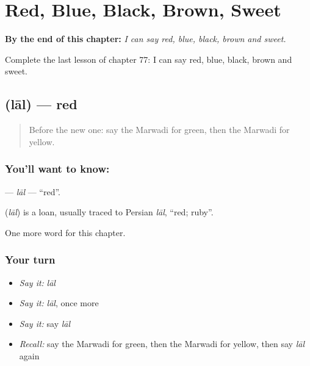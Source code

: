 
\chapter{Red, Blue, Black, Brown, Sweet}
\label{ch:mw-red-blue-black-brown-sweet}

\begin{chapteropening}
\textbf{By the end of this chapter:} \emph{I can say red, blue, black, brown and sweet.}

Complete the last lesson of chapter 77: I can say red, blue, black, brown and sweet.
\end{chapteropening}

\section[\texorpdfstring{\mw{लाल} (lāl)}{लाल (lāl)}]{ (lāl) — red}

\label{lesson:MW-C77-lal}



\begin{quote}
Before the new one: say the Marwadi for green, then the Marwadi for yellow.
\end{quote}

\subsection*{You'll want to know: }
\textbf{} — \emph{lāl} — \textquotedblleft{}red\textquotedblright{}.

\begin{cousinweb}
\textbf{} (\emph{lāl}) is a loan, usually traced to Persian \emph{lāl}, \textquotedblleft{}red; ruby\textquotedblright{}.
\end{cousinweb}

\begin{grammarlens}[title={What you've built}]
One more word for this chapter.
\end{grammarlens}

\subsection*{Your turn}
\begin{itemize}
\raggedright
  \item \emph{Say it:} \emph{lāl}
  \item \emph{Say it:} \emph{lāl}, once more
  \item \emph{Say it:} say \emph{lāl}
  \item \emph{Recall:} say the Marwadi for green, then the Marwadi for yellow, then say \emph{lāl} again
\end{itemize}

